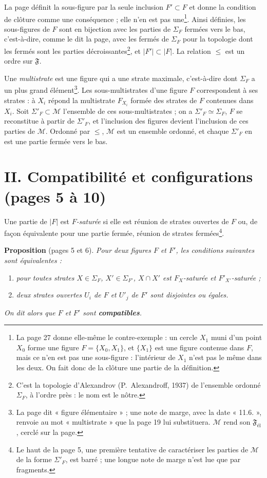 \documentclass[11pt,a4paper]{article}
\begin{document}
La page définit la sous-figure par la seule inclusion $F' \subset F$ et donne
la condition de clôture comme une conséquence ; elle n'en est pas
une\footnote{La page 27 donne elle-même le contre-exemple : un cercle $X_{1}$
muni d'un point $X_{0}$ forme une figure $F = \{X_{0}, X_{1}\}$, et $\{X_{1}\}$
est une figure contenue dans $F$, mais ce n'en est pas une sous-figure :
l'intérieur de $X_{1}$ n'est pas le même dans les deux. On fait donc de la
clôture une partie de la définition.}. Ainsi définies, les sous-figures de $F$
sont en bijection avec les parties de $\Sigma_{F}$ fermées vers le bas,
c'est-à-dire, comme le dit la page, avec les fermés de $\Sigma_{F}$ pour la
topologie dont les fermés sont les parties décroissantes\footnote{C'est la
topologie d'Alexandrov (P.~Alexandroff, 1937) de l'ensemble ordonné
$\Sigma_{F}$, à l'ordre près : le nom est le nôtre.}, et $|F'| \subset
|F|$. La relation $\leq$ est un ordre sur $\mathfrak{F}$.

Une \emph{multistrate} est une figure qui a une strate maximale, c'est-à-dire
dont $\Sigma_{F}$ a un plus grand élément\footnote{La page dit « figure
élémentaire » ; une note de marge, avec la date « 11.6. », renvoie au mot
« multistrate » que la page 19 lui substituera. $\mathcal{M}$ rend son
$\mathfrak{F}_{\text{él}}$, cerclé sur la page.}. Les sous-multistrates d'une
figure $F$ correspondent à ses strates : à $X_{i}$ répond la multistrate
$F_{X_{i}}$ formée des strates de $F$ contenues dans $X_{i}$. Soit
$\Sigma'_{F} \subset \mathcal{M}$ l'ensemble de ces sous-multistrates ; on a
$\Sigma'_{F} \simeq \Sigma_{F}$, $F$ se reconstitue à partir de
$\Sigma'_{F}$, et l'inclusion des figures devient l'inclusion de ces parties de
$\mathcal{M}$. Ordonné par $\leq$, $\mathcal{M}$ est un ensemble ordonné, et
chaque $\Sigma'_{F}$ en est une partie fermée vers le bas.

\section*{II. Compatibilité et configurations (pages 5 à 10)}

Une partie de $|F|$ est \emph{$F$-saturée} si elle est réunion de strates
ouvertes de $F$ ou, de façon équivalente pour une partie fermée, réunion de
strates fermées\footnote{Le haut de la page 5, une première tentative de
caractériser les parties de $\mathcal{M}$ de la forme $\Sigma'_{F}$, est barré ;
une longue note de marge n'est lue que par fragments.}.

\textbf{Proposition} (pages 5 et 6). \emph{Pour deux figures $F$ et $F'$, les
conditions suivantes sont équivalentes :}
\begin{enumerate}
\item[a)] \emph{pour toutes strates $X \in \Sigma_{F}$, $X' \in \Sigma_{F'}$,
$X \cap X'$ est $F_{X}$-saturée et $F'_{X'}$-saturée ;}
\item[b)] \emph{deux strates ouvertes $U_{i}$ de $F$ et $U'_{j}$ de $F'$ sont
disjointes ou égales.}
\end{enumerate}
\emph{On dit alors que $F$ et $F'$ sont \textbf{compatibles}.}
\end{document}
